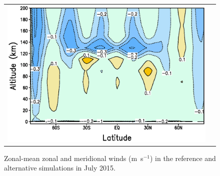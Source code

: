 \begin{figure}
\begin{center}
\begin{tabular}[h]{cc}
   \includegraphics[width=8.cm,angle=-0,clip]{figures/sectionV_pole.eps} \\
\end{tabular}
    \caption{
\label{fg:section_wind}
Zonal-mean zonal and meridional winds (m~s$^{-1}$) in the reference and alternative 
simulations in July 2015. 
}
  \end{center}
\end{figure}


